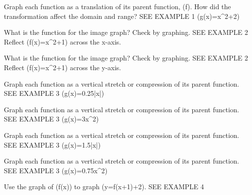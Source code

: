 \documentclass{article}
\newenvironment{practice}[2]{}{}        %
\newcommand{\answer}[1]{}               %
\newcommand{\placeholder}[2]{}          %
\begin{document}
\begin{practice}{21}{1}
Graph each function as a translation of its parent function, (f). How did the transformation affect the domain and range? SEE EXAMPLE 1
(g(x)=x^2+2)
\answer{The domain values of (f) and (g) are the same, but the range values of (g) are 2 units greater than those of (f).}
\placeholder{graph}{Answer 21 on PDF35: blue upward parabola f=x^2 vertex (0,0), red g=x^2+2 vertex (0,2). Unit grid [-5,5] by [-5,5], x/y axes arrowed, origin O, labels -4,-2,2,4 on both axes; all upper curve ends arrowed, color labels f,g, no point circles.}
\end{practice}
\begin{practice}{22}{1}
What is the function for the image graph? Check by graphing. SEE EXAMPLE 2
Reflect (f(x)=x^2+1) across the x-axis.
\answer{(f(x)=-x^2-1)}
\end{practice}
\begin{practice}{23}{1}
What is the function for the image graph? Check by graphing. SEE EXAMPLE 2
Reflect (f(x)=x^2+1) across the y-axis.
\answer{(f(x)=x^2+1)}
\end{practice}
\begin{practice}{24}{1}
Graph each function as a vertical stretch or compression of its parent function. SEE EXAMPLE 3
(g(x)=0.25|x|)
\answer{See back of book.}
\end{practice}
\begin{practice}{25}{1}
Graph each function as a vertical stretch or compression of its parent function. SEE EXAMPLE 3
(g(x)=3x^2)
\answer{See back of book.}
\end{practice}
\begin{practice}{26}{1}
Graph each function as a vertical stretch or compression of its parent function. SEE EXAMPLE 3
(g(x)=1.5|x|)
\answer{See back of book.}
\end{practice}
\begin{practice}{27}{1}
Graph each function as a vertical stretch or compression of its parent function. SEE EXAMPLE 3
(g(x)=0.75x^2)
\answer{See back of book.}
\end{practice}
\begin{practice}{28}{1}
Use the graph of (f(x)) to graph (y=f(x+1)+2). SEE EXAMPLE 4
\placeholder{graph}{Blue polyline f joins filled endpoint (-3,0), vertex (1,-4), vertex (2,3), filled endpoint (5,0). Unit square grid [-5,5] by [-5,5]; x/y axes arrowed, origin O, x labels -4,2,4 and y labels -4,2,4. No curve arrows.}
\answer{See back of book.}
\end{practice}
\end{document}
